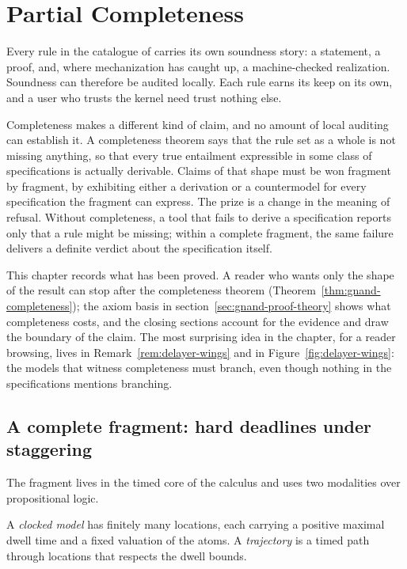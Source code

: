 \chapter{Partial Completeness}
\label{ch:qtsl-partial-completeness}

Every rule in the catalogue of  carries its own soundness story: a statement, a proof, and,
where mechanization has caught up, a machine-checked realization.
Soundness can therefore be audited locally. Each rule earns its keep
on its own, and a user who trusts the kernel need trust nothing else.

Completeness makes a different kind of claim, and no amount of local
auditing can establish it. A completeness theorem says that the rule
set as a whole is not missing anything, so that every true entailment
expressible in some class of specifications is actually derivable.
Claims of that shape must be won fragment by fragment, by exhibiting
either a derivation or a countermodel for every specification the
fragment can express. The prize is a change in the meaning of
refusal. Without completeness, a tool that fails to derive a
specification reports only that a rule might be missing; within a
complete fragment, the same failure delivers a definite verdict about
the specification itself.

This chapter records what has been proved. A reader who wants only
the shape of the result can stop after the completeness theorem
(Theorem~\ref{thm:gnand-completeness}); the axiom basis in
section~\ref{sec:gnand-proof-theory} shows what completeness costs,
and the closing sections account for the evidence and draw the
boundary of the claim. The most surprising idea in the chapter, for
a reader browsing, lives in Remark~\ref{rem:delayer-wings} and in
Figure~\ref{fig:delayer-wings}: the models that witness completeness
must branch, even though nothing in the specifications mentions
branching.

\section{A complete fragment: hard deadlines under staggering}
\label{sec:qtsl-gnand}

The fragment lives in the timed core of the calculus and uses two
modalities over propositional logic.

\begin{definition}
\label{def:clocked-model}
A \emph{clocked model} has finitely many locations, each carrying a
positive maximal dwell time and a fixed valuation of the atoms. A
\emph{trajectory} is a timed path through locations that respects the
dwell bounds.
\end{definition}

